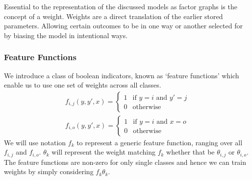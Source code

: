 \documentclass[../main.tex]{subfiles}
\begin{document}
Essential to the representation of the discussed models as factor graphs is the concept of a weight.
Weights are a direct translation of the earlier stored parameters.
Allowing certain outcomes to be in one way or another selected for by biasing the model in intentional ways.

\subsubsection{Feature Functions}

We introduce a class of boolean indicators, known as `feature functions' which enable us to use one set of weights across all classes.
\begin{gather*}
    f_{i,j}(y, y', x) = %
        \begin{cases}
            1 & \text{if } y = i \text{ and } y' = j\\
            0 & \text{otherwise}
        \end{cases} \\
    f_{i,o}(y, y', x) =
        \begin{cases}
            1 & \text{if } y = i \text{ and } x = o\\
            0 & \text{otherwise}
        \end{cases}
\end{gather*}
We will use notation $f_k$ to represent a generic feature function, ranging over all $f_{i,j}$ and $f_{i,o}$.
$\theta_k$ will represent the weight matching $f_k$ whether that be $\theta_{i,j}$ or $\theta_{i,o}$.
The feature functions are non-zero for only single classes and hence we can train weights by simply considering $f_k \theta_k$.
\end{document}
